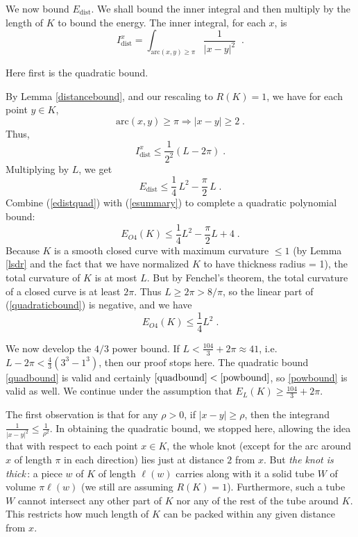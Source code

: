 \documentclass{elsart}
\def\E{E}
\begin{document}
\begin{pf}
We now bound $\E_{\mathrm{dist}}$.  We shall  bound the
inner integral and then multiply by the length of $K$ to
bound the energy.   The inner integral, for each $x$, is 
$$I^x_{\mathrm{dist}}=\int\nolimits_{\mathrm{arc}(x,y)
\geq \pi}
\frac{1}{|x-y|^2}\;\;.$$

Here first is the quadratic bound.

By Lemma \ref{distancebound}, and our rescaling to
$R(K)=1$, we have for each point $y \in K$,  
$$\mathrm{arc}(x,y) \geq \pi \Rightarrow |x-y|
\geq 2\;.$$ Thus,   
$$I_{\mathrm{dist}}^x\leq
\frac{1}{2^2}(L-2\pi)\;.$$  Multiplying by $L$, we get 
\begin{equation}
\E_{\mathrm{dist}} \leq
\frac{1}{4}\,L^2-\frac{\pi}{2}\,L\;.
\label{edistquad}
\end{equation} Combine (\ref{edistquad}) with
(\ref{esummary}) to complete a quadratic polynomial bound:
\begin{equation}
\label{quadraticbound}
\E_{O4}(K)
\leq \frac{1}{4}  L^2 - \frac{\pi}{2} L + 4\;.
\end{equation}
Because $K$ is a smooth closed curve with maximum
curvature $\leq 1$ (by Lemma \ref{lsdr} and the fact
that we have normalized $K$ to have thickness radius = 1),
the total curvature of
$K$ is at most
$L$. But by Fenchel's theorem, the total curvature of a
closed curve is at least $2\pi$. Thus $L\geq 2\pi>8/\pi$,
so the linear part of 
(\ref{quadraticbound}) is negative, and we have
\begin{equation}
\label{finalquadraticbound}
\E_{O4}(K)
\leq \frac{1}{4}  L^2\;.
\end{equation}


We now develop the  $4/3$  power bound.   
If $L<\frac{104}{3}+2\pi\approx 41$, i.e.{}
$L-2\pi<\frac{4}{3}\left(3^3-1^3\right)$, then
our proof stops here.  The quadratic bound \eqref{quadbound} is
valid and certainly $\eqref{quadbound} < \eqref{powbound}$,
so \eqref{powbound} is valid as well.
We continue under the assumption that $E_L(K)\geq \frac{104}{3}+2\pi$.

The first  observation is that for any $\rho >0$, if
$|x-y|\geq
\rho$, then the integrand $\frac{1}{|x-y|^2} \leq
\frac{1}{\rho^2}$.   In obtaining the quadratic bound,  we
stopped here, allowing the idea that with respect to each
point
$x \in K$, the whole knot (except for the arc around $x$
of length
$\pi$ in each direction) lies just at distance $2$ from 
$x$.  But {\it the knot is thick}\,:  a piece
$w$ of $K$ of length $\ell(w)$ carries along with it a
solid tube
$W$ of volume $\pi
\ell(w)$ (we still are assuming
$R(K)=1$).  Furthermore,  such a tube $W$ cannot intersect
any other part of $K$ nor any of the rest of the tube
around $K$.  This restricts how much length of $K$ can be
packed within any given distance from $x$.


\end{pf}
\end{document}
